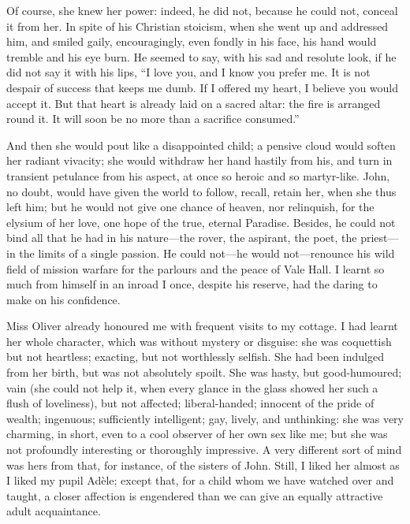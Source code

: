 Of course, she knew her power: indeed, he did not, because he could not,
conceal it from her. In spite of his Christian stoicism, when she went
up and addressed him, and smiled gaily, encouragingly, even fondly in
his face, his hand would tremble and his eye burn. He seemed to say,
with his sad and resolute look, if he did not say it with his lips,
\enquote{I love you, and I know you prefer me. It is not despair of
	success that keeps me dumb. If I offered my heart, I believe you would
	accept it. But that heart is already laid on a sacred altar: the fire
	is arranged round it. It will soon be no more than a sacrifice
	consumed.}

And then she would pout like a disappointed child; a pensive cloud would
soften her radiant vivacity; she would withdraw her hand hastily from
his, and turn in transient petulance from his aspect, at once so heroic
and so martyr-like. \St{} John, no doubt, would have given the world to
follow, recall, retain her, when she thus left him; but he would not
give one chance of heaven, nor relinquish, for the elysium of her love,
one hope of the true, eternal Paradise. Besides, he could not bind all
that he had in his nature---the rover, the aspirant, the poet, the
priest---in the limits of a single passion. He could not---he would
not---renounce his wild field of mission warfare for the parlours and
the peace of Vale Hall. I learnt so much from himself in an inroad I
once, despite his reserve, had the daring to make on his confidence.

Miss Oliver already honoured me with frequent visits to my cottage. I
had learnt her whole character, which was without mystery or disguise:
she was coquettish but not heartless; exacting, but not worthlessly
selfish. She had been indulged from her birth, but was not absolutely
spoilt. She was hasty, but good-humoured; vain (she could not help it,
when every glance in the glass showed her such a flush of loveliness),
but not affected; liberal-handed; innocent of the pride of wealth;
ingenuous; sufficiently intelligent; gay, lively, and unthinking: she
was very charming, in short, even to a cool observer of her own sex like
me; but she was not profoundly interesting or thoroughly impressive. A
very different sort of mind was hers from that, for instance, of the
sisters of \St{} John. Still, I liked her almost as I liked my pupil
Adèle; except that, for a child whom we have watched over and taught, a
closer affection is engendered than we can give an equally attractive
adult acquaintance.

